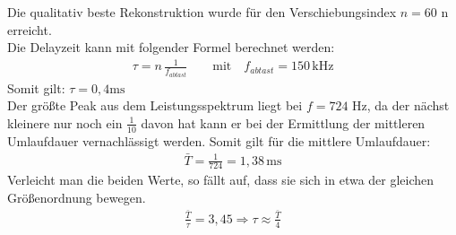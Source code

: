 Die qualitativ beste Rekonstruktion wurde für den Verschiebungsindex $n= 60$ n erreicht.\\
Die Delayzeit kann mit folgender Formel berechnet werden: 
\begin{align}
    \tau = n \, \frac{1}{f_{abtast}} \qquad \text{mit} \quad f_{abtast} = 150 \, \text{kHz}
\end{align}
Somit gilt: $\tau = 0,4 \text{ms}$ \\

Der größte Peak aus dem Leistungsspektrum liegt bei $f=724$ Hz, da der nächst kleinere nur noch ein $\frac{1}{10}$ davon hat kann er bei der Ermittlung der mittleren Umlaufdauer vernachlässigt werden. Somit gilt für die mittlere Umlaufdauer: 
\begin{align}
    \bar{T} = \frac{1}{724} = 1,38 \, \text{ms}
\end{align}
Verleicht man die beiden Werte, so fällt auf, dass sie sich in etwa der gleichen Größenordnung bewegen.
\begin{align}
    \frac{\bar{T}}{\tau} = 3,45 \Rightarrow \tau \approx \frac{\bar{T}}{4}
\end{align}

